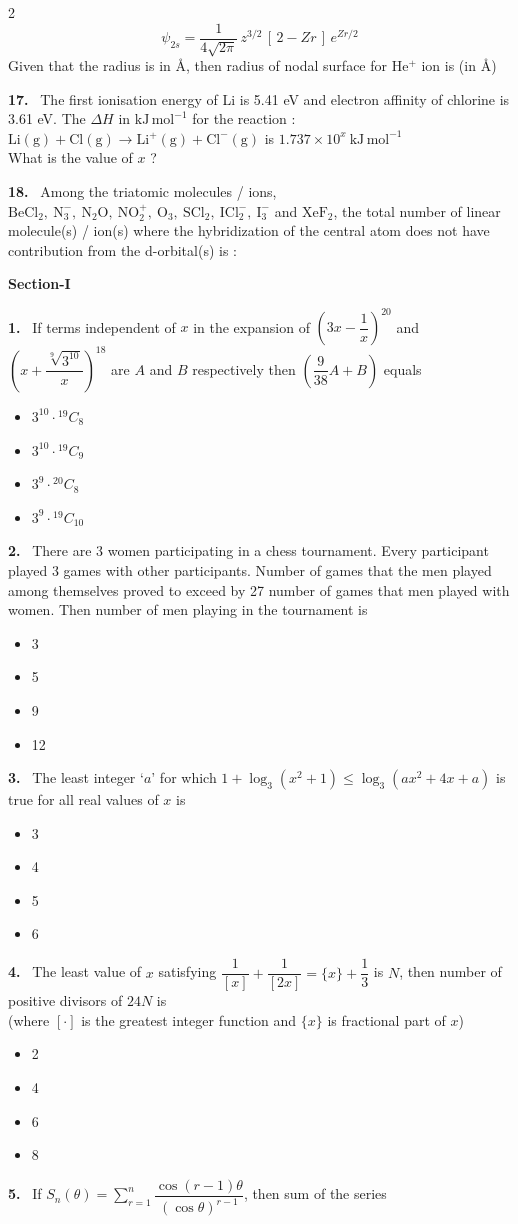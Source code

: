 \documentclass[10pt]{extarticle}
\newcommand{\partsec}[2]{\par\medskip\noindent{\large\bfseries PART-#1: #2}\par\smallskip}
\newcommand{\sect}[1]{\par\smallskip\noindent\textbf{#1}\par}
\newcommand{\qn}[1]{\par\smallskip\noindent\textbf{#1.}~}
\newenvironment{qoptions}{\begin{itemize}[leftmargin=1.8em,itemsep=1pt,topsep=2pt,label={}]}{\end{itemize}}
\newcommand{\opt}[2]{\item[(#1)] #2}
\begin{document}
\begin{multicols}{2}
\[\psi_{2s}=\frac{1}{4\sqrt{2\pi}}\,z^{3/2}\,[\,2-Zr\,]\,e^{Zr/2}\]
Given that the radius is in \AA, then radius of nodal surface for $\mathrm{He^+}$ ion is (in \AA)
\qn{17} The first ionisation energy of Li is 5.41 eV and electron affinity of chlorine is 3.61 eV. The $\Delta H$ in $\mathrm{kJ\,mol^{-1}}$ for the reaction :\\
$\mathrm{Li(g)+Cl(g)\to Li^{+}(g)+Cl^{-}(g)}$ is $1.737\times10^{x}\ \mathrm{kJ\,mol^{-1}}$\\
What is the value of $x$ ?
\qn{18} Among the triatomic molecules / ions, $\mathrm{BeCl_2,\ N_3^{-},\ N_2O,\ NO_2^{+},\ O_3,\ SCl_2,\ ICl_2^{-},\ I_3^{-}}$ and $\mathrm{XeF_2}$, the total number of linear molecule(s) / ion(s) where the hybridization of the central atom does not have contribution from the d-orbital(s) is :
\partsec{3}{MATHEMATICS}
\sect{Section-I}
\qn{1} If terms independent of $x$ in the expansion of $\left(3x-\dfrac1x\right)^{20}$ and $\left(x+\dfrac{\sqrt[9]{3^{10}}}{x}\right)^{18}$ are $A$ and $B$ respectively then $\left(\dfrac{9}{38}A+B\right)$ equals
\begin{qoptions}
\opt{A}{$3^{10}\cdot{}^{19}C_8$}
\opt{B}{$3^{10}\cdot{}^{19}C_9$}
\opt{C}{$3^{9}\cdot{}^{20}C_8$}
\opt{D}{$3^{9}\cdot{}^{19}C_{10}$}
\end{qoptions}
\qn{2} There are 3 women participating in a chess tournament. Every participant played 3 games with other participants. Number of games that the men played among themselves proved to exceed by 27 number of games that men played with women. Then number of men playing in the tournament is \underline{\hspace{1cm}}
\begin{qoptions}
\opt{A}{3}
\opt{B}{5}
\opt{C}{9}
\opt{D}{12}
\end{qoptions}
\qn{3} The least integer `$a$' for which $1+\log_3\left(x^2+1\right)\le\log_3\left(ax^2+4x+a\right)$ is true for all real values of $x$ is
\begin{qoptions}
\opt{A}{3}
\opt{B}{4}
\opt{C}{5}
\opt{D}{6}
\end{qoptions}
\qn{4} The least value of $x$ satisfying $\dfrac{1}{[x]}+\dfrac{1}{[2x]}=\{x\}+\dfrac13$ is $N$, then number of positive divisors of $24N$ is\\
(where $[\cdot]$ is the greatest integer function and $\{x\}$ is fractional part of $x$)
\begin{qoptions}
\opt{A}{2}
\opt{B}{4}
\opt{C}{6}
\opt{D}{8}
\end{qoptions}
\qn{5} If $S_n(\theta)=\displaystyle\sum_{r=1}^{n}\dfrac{\cos(r-1)\theta}{(\cos\theta)^{r-1}}$, then sum of the series

\end{multicols}
\end{document}
